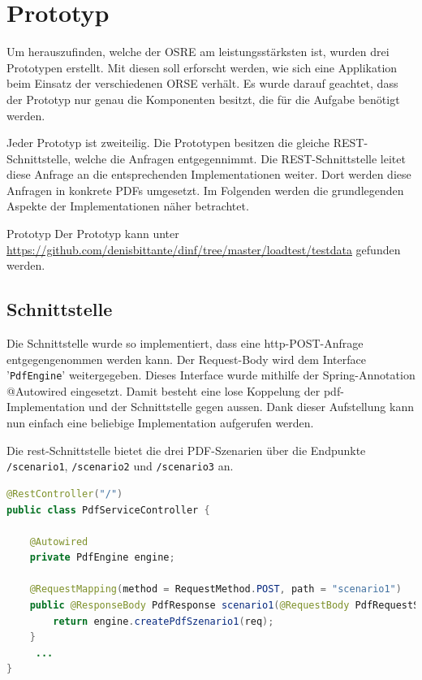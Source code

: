 \documentclass[main.tex]{subfiles}
\begin{document}
\chapter{Prototyp}
Um herauszufinden, welche der OSRE am leistungsstärksten ist, wurden drei Prototypen erstellt. Mit diesen soll erforscht werden, wie sich eine Applikation beim Einsatz der verschiedenen ORSE verhält. Es wurde darauf geachtet, dass der Prototyp nur genau die Komponenten besitzt, die für die Aufgabe benötigt werden.  

Jeder Prototyp ist zweiteilig. Die Prototypen besitzen die gleiche REST-Schnittstelle, welche die Anfragen entgegennimmt. Die REST-Schnittstelle leitet diese Anfrage an die entsprechenden Implementationen weiter. Dort werden diese Anfragen in konkrete PDFs umgesetzt. Im Folgenden werden die grundlegenden Aspekte der Implementationen näher betrachtet. 

\begin{reference}{Prototyp}
 Der Prototyp kann unter \url{https://github.com/denisbittante/dinf/tree/master/loadtest/testdata} gefunden werden.
\end{reference}

\section{Schnittstelle}


Die Schnittstelle wurde so implementiert, dass eine \acrshort{http}-POST-Anfrage entgegengenommen werden kann. Der Request-Body wird dem Interface '\texttt{PdfEngine}' weitergegeben. Dieses Interface wurde mithilfe der Spring-Annotation @Autowired eingesetzt. Damit besteht eine lose Koppelung der \acrshort{pdf}-Implementation und der Schnittstelle gegen aussen. Dank dieser Aufstellung kann nun einfach eine beliebige Implementation aufgerufen werden.

Die \acrshort{rest}-Schnittstelle bietet die drei PDF-Szenarien über die Endpunkte \texttt{/scenario1}, \texttt{/scenario2} und \texttt{/scenario3} an.   

\begin{lstlisting}[language=Java]
@RestController("/")
public class PdfServiceController {

	@Autowired
	private PdfEngine engine;

	@RequestMapping(method = RequestMethod.POST, path = "scenario1")
	public @ResponseBody PdfResponse scenario1(@RequestBody PdfRequestScenario1 req) {
		return engine.createPdfSzenario1(req);
	}
     ...
}
\end{lstlisting}
\end{document}
